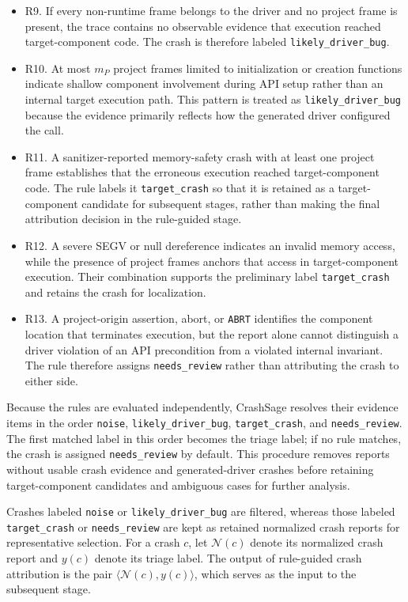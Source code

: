 \documentclass[pdflatex,sn-basic]{sn-jnl}%
\theoremstyle{thmstyleone}%
\theoremstyle{thmstyletwo}%
\theoremstyle{thmstylethree}%
\begin{document}
\begin{itemize}
    \item R9. If every non-runtime frame belongs to the driver and no project frame is present, the trace contains no observable evidence that execution reached target-component code. The crash is therefore labeled \texttt{likely\_driver\_bug}.
    \item R10. At most \(m_P\) project frames limited to initialization or creation functions indicate shallow component involvement during API setup rather than an internal target execution path. This pattern is treated as \texttt{likely\_driver\_bug} because the evidence primarily reflects how the generated driver configured the call.
    \item R11. A sanitizer-reported memory-safety crash with at least one project frame establishes that the erroneous execution reached target-component code. The rule labels it \texttt{target\_crash} so that it is retained as a target-component candidate for subsequent stages, rather than making the final attribution decision in the rule-guided stage.
    \item R12. A severe SEGV or null dereference indicates an invalid memory access, while the presence of project frames anchors that access in target-component execution. Their combination supports the preliminary label \texttt{target\_crash} and retains the crash for localization.
    \item R13. A project-origin assertion, abort, or \texttt{ABRT} identifies the component location that terminates execution, but the report alone cannot distinguish a driver violation of an API precondition from a violated internal invariant. The rule therefore assigns \texttt{needs\_review} rather than attributing the crash to either side.
\end{itemize}

Because the rules are evaluated independently, CrashSage resolves their evidence items in the order \texttt{noise}, \texttt{likely\_driver\_bug}, \texttt{target\_crash}, and \texttt{needs\_review}.
The first matched label in this order becomes the triage label; if no rule matches, the crash is assigned \texttt{needs\_review} by default.
This procedure removes reports without usable crash evidence and generated-driver crashes before retaining target-component candidates and ambiguous cases for further analysis.

Crashes labeled \texttt{noise} or \texttt{likely\_driver\_bug} are filtered, whereas those labeled \texttt{target\_crash} or \texttt{needs\_review} are kept as retained normalized crash reports for representative selection.
For a crash \(c\), let \(\mathcal{N}(c)\) denote its normalized crash report and \(y(c)\) denote its triage label.
The output of rule-guided crash attribution is the pair \(\langle\mathcal{N}(c),y(c)\rangle\), which serves as the input to the subsequent stage.
\end{document}

